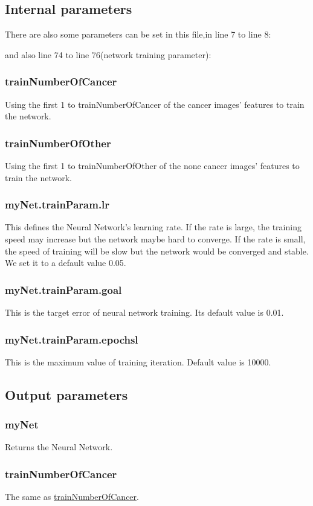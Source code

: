 \documentclass[14pt]{report} %
\begin{document}
\subsection{Internal parameters}
	There are also some parameters can be set in this file,in line 7 to line 8:
	
	and also line 74 to line 76(network training parameter):
	
\subsubsection{trainNumberOfCancer}
	Using the first 1 to trainNumberOfCancer of the cancer images' features to train the network.
	\label{par:trainNumberOfCancer} 
\subsubsection{trainNumberOfOther}
	Using the first 1 to  trainNumberOfOther of the none cancer images' features to train the network.
	\label{par:trainNumberOfOther} 
\subsubsection{myNet.trainParam.lr}
	This defines the Neural Network's learning rate. If the rate is large, the training speed may increase but the network maybe hard to converge. If the rate is small, the speed of training will be slow but the network would be converged and stable.
	\\We set it to a default value 0.05.
\subsubsection{myNet.trainParam.goal}
	This is the target error of neural network training. Its default value is 0.01.
\subsubsection{myNet.trainParam.epochsl}
	This is the maximum value of training iteration. Default value is 10000.
\subsection{Output parameters}
\subsubsection{myNet}
	Returns the Neural Network.
\subsubsection{trainNumberOfCancer}
	The same as  \hyperref[par:trainNumberOfCancer]{trainNumberOfCancer}.
\end{document}
